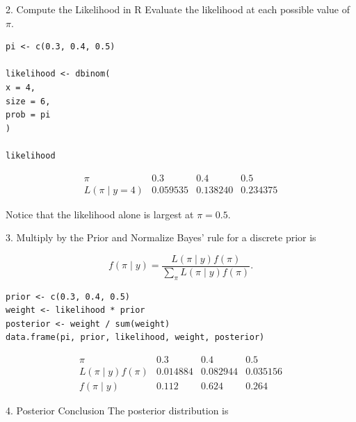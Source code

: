 \documentclass[12pt]{beamer}
\begin{document}
{%
\begin{frame}[fragile]{}
\begin{block}{2. Compute the Likelihood in R}
Evaluate the likelihood at each possible value of $\pi$.

\begin{verbatim}
pi <- c(0.3, 0.4, 0.5)

likelihood <- dbinom(
x = 4,
size = 6,
prob = pi
)

likelihood
\end{verbatim}

\[
\begin{array}{c|ccc}
\pi & 0.3 & 0.4 & 0.5 \\ \hline
L(\pi\mid y=4)
& 0.059535
& 0.138240
& 0.234375
\end{array}
\]

\vspace{0.25cm}
Notice that the likelihood alone is largest at $\pi=0.5.$
\end{block}
\end{frame}

\begin{frame}[fragile]{}
\begin{block}{3. Multiply by the Prior and Normalize}
Bayes' rule for a discrete prior is

\[
f(\pi\mid y)
=
\frac{L(\pi\mid y)f(\pi)}
{\sum_{\pi}L(\pi\mid y)f(\pi)}.
\]

\vspace{0.25cm}
\begin{verbatim}
prior <- c(0.3, 0.4, 0.5)
weight <- likelihood * prior
posterior <- weight / sum(weight)
data.frame(pi, prior, likelihood, weight, posterior)
\end{verbatim}

\vspace{0.25cm}
\[
\begin{array}{c|ccc}
\pi & 0.3 & 0.4 & 0.5 \\ \hline
L(\pi\mid y)f(\pi)
& 0.014884 & 0.082944 & 0.035156 \\
f(\pi\mid y)
& 0.112 & 0.624 & 0.264
\end{array}
\]
\end{block}
\end{frame}

\begin{frame}[fragile]{}
\begin{block}{4. Posterior Conclusion}
The posterior distribution is


\end{block}
\end{frame}}
\end{document}
